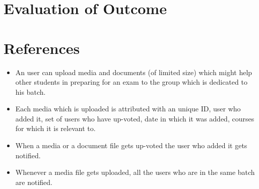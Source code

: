 \documentclass{article}
\begin{document}
\section{Evaluation of Outcome}
 

\section{References}
\begin{itemize}
\item An user can upload media and documents (of limited size) which might help other students in preparing for an exam to the group which is dedicated to his batch.
\item Each media which is uploaded is attributed with an unique ID, user who added it, set of users who have up-voted, date in which it was added, courses for which it is relevant to.
\item When a media or a document file gets up-voted the user who added it gets notified. 
\item Whenever a media file gets uploaded, all the users who are in the same batch are notified.

\end{itemize}
\end{document}
